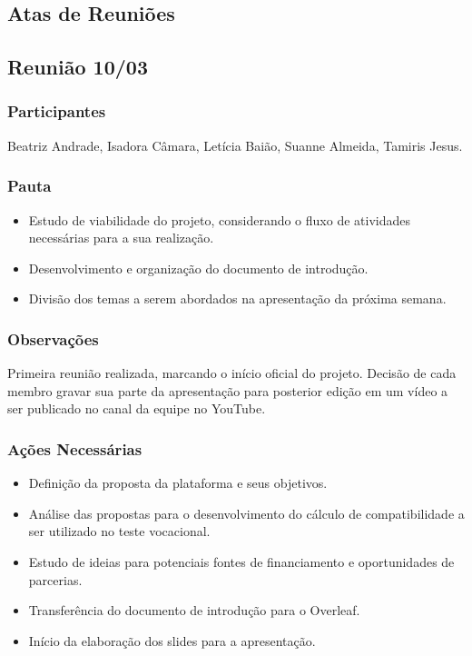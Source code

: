 \begin{apendicesenv}
\chapter{Atas de Reuniões}
\label{apendice_j}

\section*{Reunião 10/03}

\subsection*{Participantes}
Beatriz Andrade, Isadora Câmara, Letícia Baião, Suanne Almeida, Tamiris Jesus.

\subsection*{Pauta}
\begin{itemize}
    \item Estudo de viabilidade do projeto, considerando o fluxo de atividades necessárias para a sua realização.
    \item Desenvolvimento e organização do documento de introdução.
    \item Divisão dos temas a serem abordados na apresentação da próxima semana.
\end{itemize}

\subsection*{Observações}
Primeira reunião realizada, marcando o início oficial do projeto. 
Decisão de cada membro gravar sua parte da apresentação para posterior edição em um vídeo a ser publicado no canal da equipe no YouTube. 

\subsection*{Ações Necessárias}
\begin{itemize}
    \item Definição da proposta da plataforma e seus objetivos.
    \item Análise das propostas para o desenvolvimento do cálculo de compatibilidade a ser utilizado no teste vocacional.
    \item Estudo de ideias para potenciais fontes de financiamento e oportunidades de parcerias.
    \item Transferência do documento de introdução para o Overleaf.
    \item Início da elaboração dos slides para a apresentação.
\end{itemize}


\end{apendicesenv}

